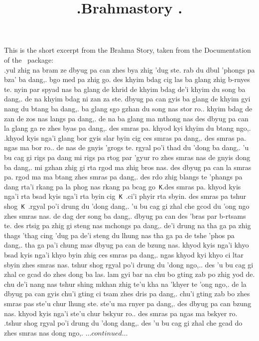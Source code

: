 \documentclass[a4pecha3,rotate]{pecha}
\begin{document}
\title{\tib\tibSwasti.\bit \hfill Brahmastory \hfill \tib.}
\nonfrenchspacing
\raggedright
\newcommand{\Kcommand}{\texttt{\char92 K}}
\maketitle
\bit This is the short excerpt from the Brahma Story, taken from the Documentation of the \TibTeX~package:\medskip\\
\tib	.yul zhig na bram ze dbyug pa can zhes bya zhig 'dug ste.
	rab du dbul 'phongs pa bza' ba dang,. bgo med pa zhig go.
	des khyim bdag cig las ba glang zhig b-rnyes te. nyin par
	spyad nas ba glang de khrid de khyim bdag de'i khyim du song
	ba dang,. de na khyim bdag ni zan za ste. dbyug pa can gyis ba
	glang de khyim gyi nang du btang ba dang,. ba glang sgo gzhan
	du song nas stor ro..  khyim bdag de zan de zos nas langs pa
	dang,. de na ba glang ma mthong nas des dbyug pa can la glang
	ga re zhes byas pa dang,. des smras pa. khyod kyi khyim du btang
	ngo,. .khyod kyis nga'i glang bor gyis slar byin cig ces smras
	pa dang,. des smras pa. ngas ma bor ro..  de nas de gnyis 'grogs
	te. rgyal po'i thad du 'dong ba dang,. 'u bu cag gi rigs pa dang
	mi rigs pa rtog par 'gyur ro zhes smras nas de gnyis dong ba
	dang,. mi gzhan zhig gi rta rgod ma zhig bros nas. des dbyug pa
	can la smras pa. rgod ma ma btang zhes smras pa dang,. des rdo
	zhig blangs te 'phangs pa dang rta'i rkang pa la phog nas rkang
	pa bcag go\Kcommand .des smras
	pa. khyod kyis nga'i rta bsad kyis nga'i rta byin cig\Kcommand\
	.ci'i phyir rta sbyin. des smras pa tshur shog\Kcommand\
	.rgyal po'i drung du 'dong dang,. 'u bu cag gi zhal che gcod du
	'ong ngo zhes smras nas. de dag der song ba dang,. dbyug pa can
	des 'bras par b-rtsams te. des rtsig pa zhig gi steng nas mchongs
	pa dang,. de'i drung na tha ga pa zhig thags 'thag cing 'dug pa
	de'i steng du lhung nas tha ga pa de tshe 'phos pa dang,. tha ga
	pa'i chung mas dbyug pa can de bzung nas. khyod kyis nga'i khyo
	bsad kyis nga'i khyo byin zhig ces smras pa dang,. ngas khyod kyi
	khyo ci ltar sbyin zhes smras nas. tshur shog rgyal po'i drung du
	'dong ngo,.. des 'u bu cag gi zhal ce gcad do zhes dong ba las.
	lam gyi bar na chu bo gting zab po zhig yod de. chu de'i nang
	nas tshur shing mkhan zhig te'u kha na 'khyer te 'ong ngo,. de la
	dbyug pa can gyis chu'i gting ci tsam zhes dris pa dang,. chu'i
	gting zab bo zhes smras pas ste'u chur lhung ste. ste'u ma rnyer
	pa dang,. des dbyug pa can bzung nas. khyod kyis nga'i ste'u
	chur bskyur ro.. des smras pa ngas ma bskyer ro.  .tshur shog
	rgyal po'i drung du 'dong dang,. des 'u bu cag gi zhal che gcad
	do zhes smras nas dong ngo,.  {\bit$\ldots continued \ldots$}%
\end{document}

